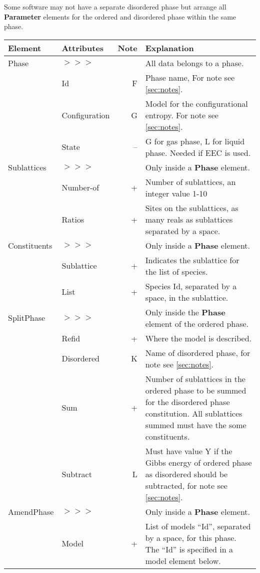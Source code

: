 \documentclass{article}
\begin{document}
Some software may not have a separate disordered phase but arrange all
{\bf Parameter} elements for the ordered and disordered phase within
the same phase.

\begin{tabular}{|p{} p{} r p{}|}\hline
  Element & Attributes & Note & Explanation\\\hline

  Phase &$>>>$&& All data belongs to a phase.\\
       & Id & F & Phase name, For note see \ref{sec:notes}. \\
       & Configuration & G & Model for the configurational entropy.  For note see \ref{sec:notes}.\\
       & State & -- & G for gas phase, L for liquid phase.  Needed if EEC is used.\\\hline

  Sublattices &$>>>$&& Only inside a {\bf Phase} element.\\
        & Number-of & + & Number of sublattices, an integer value 1-10 \\
        & Ratios & + & Sites on the sublattices, as many reals as sublattices separated by a space.\\\hline

  Constituents &$>>>$&& Only inside a {\bf Phase} element.\\
        & Sublattice & + & Indicates the sublattice for the list of species.\\
        & List & + & Species Id, separated by a space, in the sublattice.\\\hline

  SplitPhase &$>>>$&& Only inside the {\bf Phase} element of the ordered phase.\\
      & Refid & + & Where the model is described.\\
      & Disordered & K & Name of disordered phase, for note see \ref{sec:notes}.\\
      & Sum & + & Number of sublattices in the ordered phase to be summed for the disordered phase constitution.  All sublattices summed must have the some constituents.\\
      & Subtract & L & Must have value Y if the Gibbs energy of ordered phase as disordered should be subtracted, for note see \ref{sec:notes}.\\\hline

  AmendPhase &$>>>$&& Only inside a {\bf Phase} element.\\
  & Model & + & List of models ``Id'', separated by a space, for this phase.  The ``Id'' is specified in a model element below.\\\hline
\end{tabular}
\end{document}
